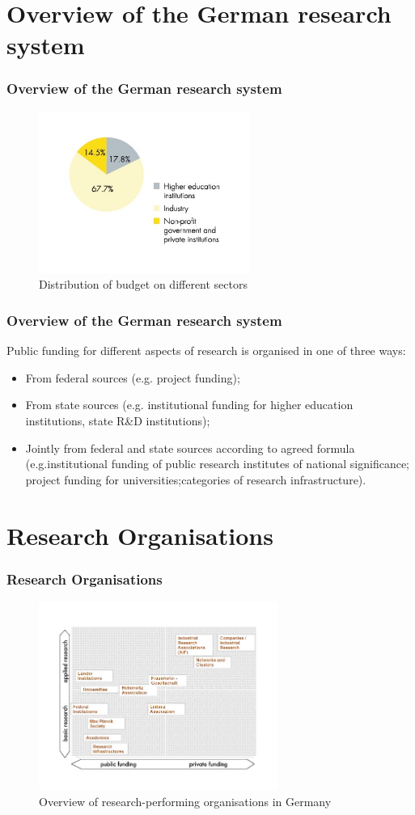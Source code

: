 \documentclass[9pt, compress]{beamer}
\begin{document}
	\section{Overview of the German research system}
	\begin{frame} 
		\frametitle{Overview of the German research system}
		\begin{figure}
        \includegraphics[width=\textwidth,height=150pt]{img/R_org_graph.jpg}
        \caption{Distribution of budget on different sectors}
		\end{figure}
	\end{frame}
	
	\begin{frame} 
		\frametitle{Overview of the German research system}
		
			Public funding for different aspects of research is organised in one of three ways: 
			\begin{itemize}
			\item From federal sources (e.g. project funding); 
            \item From state sources (e.g. institutional funding for higher education
institutions, state R\&D institutions); 
            \item Jointly from federal and state sources according to agreed formula (e.g.institutional funding of public research institutes of national significance; project funding for universities;categories of research infrastructure).
		\end{itemize}
	
	\end{frame}
	\section{Research Organisations}
	\begin{frame} 
		\frametitle{Research Organisations}
		\begin{figure}
		\includegraphics[width=\textwidth,height=175pt]{img/ResearchOrg.jpg}
		\caption{Overview of research-performing organisations in Germany}
		\end{figure}
	\end{frame}
\end{document}
